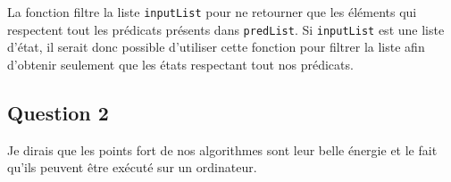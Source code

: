 \documentclass[a4paper, 12pt]{article} %
\begin{document}
La fonction filtre la liste \texttt{inputList} pour ne retourner que les éléments qui respectent tout les prédicats présents dans \texttt{predList}.
Si \texttt{inputList} est une liste d'état, il serait donc possible d'utiliser cette fonction pour filtrer la liste afin d'obtenir seulement que les états 
respectant tout nos prédicats.

\subsection*{Question 2}
Je dirais que les points fort de nos algorithmes sont leur belle énergie et le fait qu'ils peuvent être exécuté sur un ordinateur.

\end{document}
